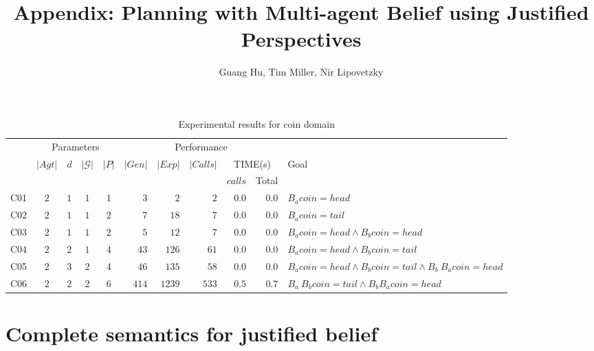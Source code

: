 \documentclass[letterpaper]{article} %
\title{Appendix: Planning with Multi-agent Belief using Justified Perspectives}
\author{
    Guang Hu,
    Tim Miller,
    Nir Lipovetzky
}
\begin{document}
\maketitle
\begin{table*}[th]
    \addtolength{\tabcolsep}{-3pt}    
    \centering
    \small
    
        \begin{tabular}{lccccrrrrrl}%
        \toprule
        
        \multirow{3}{*}{}
        & \multicolumn{4}{c}{Parameters} & \multicolumn{5}{c}{Performance} &  \\
         \cmidrule(lr){2-5} \cmidrule(lr){6-10}
        & \multirow{2}{*}{$|Agt|$} & \multirow{2}{*}{$d$} & \multirow{2}{*}{$|\mathcal{G}|$} & \multirow{2}{*}{$|P|$} & \multirow{2}{*}{$|Gen|$} & \multirow{2}{*}{$|Exp|$} & \multirow{2}{*}{$|Calls|$} & \multicolumn{2}{c}{TIME(s)} &\multirow{2}{*}{Goal} \\
        & & & & & & & & {$calls$} & Total & \\
        \midrule
        C01 & $2$ & $1$ & $1$ & $1$ & $3$ & $2$ & $2$ & $0.0$ & $0.0$ & $B_a coin=head $ \\
        C02 & $2$ & $1$ & $1$ & $2$ & $7$ & $18$ & $7$ & $0.0$  & $0.0$ & $B_a coin=tail$ \\
        C03 & $2$ & $1$ & $1$ & $2$ & $5$ & $12$ & $7$ & $0.0$ & $0.0$ & $B_a coin=head \land B_b coin=head$ \\
        C04 & $2$ & $2$ & $1$ & $4$ & $43$ & $126$ & $61$ & $0.0$ & $0.0$& $ B_a coin=head \land B_b coin=tail $ \\
        C05 & $2$ & $3$ & $2$ & $4$ & $46$ & $135$ & $58$ & $0.0$ & $0.0$ & $ B_a coin=head \land B_b coin=tail \land B_b\ B_a coin=head $ \\
        C06 & $2$ & $2$ & $2$ & $6$ & $414$ & $1239$ & $533$ & $0.5$ & $0.7$ & $ B_a\ B_b coin=tail \land B_b B_a coin=head$ \\
        

        \bottomrule
    \end{tabular}
    \caption{Experimental results for coin domain}
    \label{tab:coin}
\end{table*}
\section{Complete semantics for justified belief}
\end{document}
